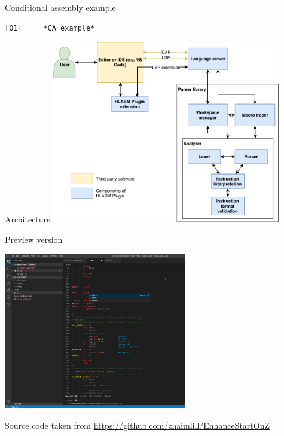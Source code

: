 \documentclass[10pt]{beamer}
\begin{document}
\begin{frame}[fragile]{Conditional assembly example}


\begin{verbatim}
[01]     *CA example*

\end{verbatim}


\end{frame}

\begin{frame}[fragile]{Architecture}
\centering
\includegraphics[width=10cm]{img/hlasm_architecture}

\end{frame}



\begin{frame}[fragile]{Preview version}

\centering
\includegraphics[width=8cm]{img/screenshot}

\small
Source code taken from \url{https://github.com/zhaimlill/EnhanceStartOnZ}

\end{frame}
\end{document}
